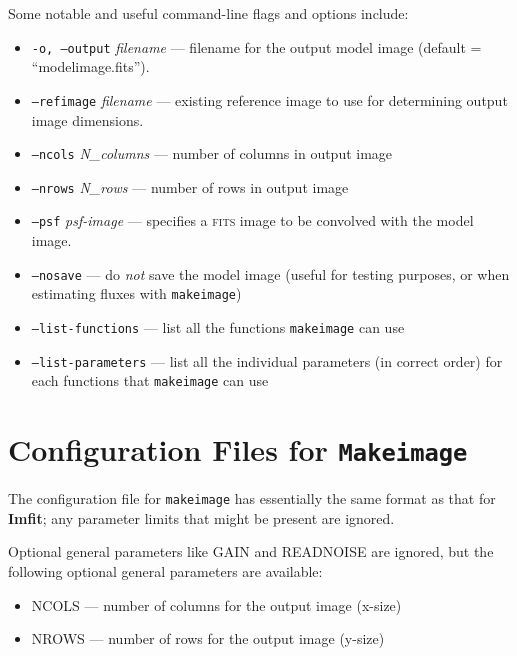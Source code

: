 \documentclass[10pt,a4paper,article]{memoir}
\newcommand{\imfit}{\textbf{Imfit}}
\newcommand{\makeimage}{\texttt{makeimage}}
\newcommand{\Makeimage}{\texttt{Makeimage}}
\begin{document}
Some notable and useful command-line flags and options include:
\begin{itemize}
\item \texttt{-o, --output} \textit{filename} --- filename for the output model
image (default = ``modelimage.fits'').

\item \texttt{--refimage} \textit{filename} --- existing reference image to
use for determining output image dimensions.

\item \texttt{--ncols} \textit{N\_columns} --- number of columns in output image

\item \texttt{--nrows} \textit{N\_rows} --- number of rows in output image

\bigskip

\item \texttt{--psf} \textit{psf-image} --- specifies a \textsc{fits} image to be convolved
with the model image.

\bigskip


\item \texttt{--nosave} --- do \textit{not} save the model image (useful for testing
purposes, or when estimating fluxes with \makeimage)

\bigskip

\item \texttt{--list-functions} --- list all the functions \makeimage{}
can use

\item \texttt{--list-parameters} --- list all the individual parameters (in correct order)
for each functions that \makeimage{} can use


\end{itemize}



\section{Configuration Files for \Makeimage{}}

The configuration file for \makeimage{} has essentially the same format as
that for \imfit; any parameter limits that might be present are ignored.

Optional general parameters like GAIN and READNOISE are ignored, but the
following optional general parameters are available:

\begin{itemize}
\item NCOLS --- number of columns for the output image (x-size)

\item NROWS --- number of rows for the output image (y-size)

\end{itemize}
\end{document}
